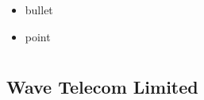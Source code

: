 \documentclass[letterpaper,10pt,openany,oneside,english]{sphinxmanual}
\begin{document}
\begin{itemize}
\item {} 
bullet

\item {} 
point

\end{itemize}


\section{}
\label{\detokenize{index:document-author-s}}

\subsection{Wave Telecom Limited}
\label{\detokenize{index:make-it-wave-ltd}}


\renewcommand{\indexname}{Index}
\printindex
\end{document}
